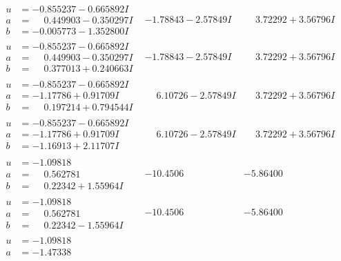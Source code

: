 \documentclass[1p]{elsarticle_modified}
\theoremstyle{definition}
\begin{document}
$$\begin{array}{c|c|c}
\begin{aligned}
u &= -0.855237 - 0.665892 I \\
a &= \phantom{-}0.449903 - 0.350297 I \\
b &= -0.005773 - 1.352800 I\end{aligned}
 & -1.78843 - 2.57849 I & \phantom{-}3.72292 + 3.56796 I \\ \hline\begin{aligned}
u &= -0.855237 - 0.665892 I \\
a &= \phantom{-}0.449903 - 0.350297 I \\
b &= \phantom{-}0.377013 + 0.240663 I\end{aligned}
 & -1.78843 - 2.57849 I & \phantom{-}3.72292 + 3.56796 I \\ \hline\begin{aligned}
u &= -0.855237 - 0.665892 I \\
a &= -1.17786 + 0.91709 I \\
b &= \phantom{-}0.197214 + 0.794544 I\end{aligned}
 & \phantom{-}6.10726 - 2.57849 I & \phantom{-}3.72292 + 3.56796 I \\ \hline\begin{aligned}
u &= -0.855237 - 0.665892 I \\
a &= -1.17786 + 0.91709 I \\
b &= -1.16913 + 2.11707 I\end{aligned}
 & \phantom{-}6.10726 - 2.57849 I & \phantom{-}3.72292 + 3.56796 I \\ \hline\begin{aligned}
u &= -1.09818\phantom{ +0.000000I} \\
a &= \phantom{-}0.562781\phantom{ +0.000000I} \\
b &= \phantom{-}0.22342 + 1.55964 I\end{aligned}
 & -10.4506\phantom{ +0.000000I} & -5.86400\phantom{ +0.000000I} \\ \hline\begin{aligned}
u &= -1.09818\phantom{ +0.000000I} \\
a &= \phantom{-}0.562781\phantom{ +0.000000I} \\
b &= \phantom{-}0.22342 - 1.55964 I\end{aligned}
 & -10.4506\phantom{ +0.000000I} & -5.86400\phantom{ +0.000000I} \\ \hline\begin{aligned}
u &= -1.09818\phantom{ +0.000000I} \\
a &= -1.47338\phantom{ +0.000000I} \\

\end{aligned}
\end{array}$$
\end{document}
